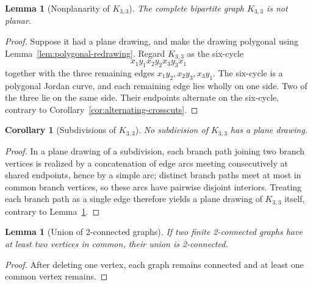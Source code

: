 \documentclass[11pt]{article}
\theoremstyle{mainplain}
\newtheorem{lemma}[theorem]{Lemma}
\newtheorem{corollary}[theorem]{Corollary}
\theoremstyle{mainroman}
\theoremstyle{definition}
\numberwithin{equation}{section}
\begin{document}
\begin{lemma}[Nonplanarity of $K_{3,3}$]\label{lem:k33}
The complete bipartite graph $K_{3,3}$ is not planar.
\end{lemma}
\begin{proof}
Suppose it had a plane drawing, and make the drawing polygonal using
Lemma~\ref{lem:polygonal-redrawing}. Regard $K_{3,3}$ as the six-cycle
\[
 x_1y_1x_2y_2x_3y_3x_1
\]
together with the three remaining edges
$x_1y_2,x_2y_3,x_3y_1$. The six-cycle is a polygonal Jordan curve, and
each remaining edge lies wholly on one side. Two of the three lie on
the same side. Their endpoints alternate on the six-cycle, contrary to
Corollary~\ref{cor:alternating-crosscuts}.
\end{proof}

\begin{corollary}[Subdivisions of $K_{3,3}$]\label{cor:k33-subdivision}
No subdivision of $K_{3,3}$ has a plane drawing.
\end{corollary}
\begin{proof}
In a plane drawing of a subdivision, each branch path joining two
branch vertices is realized by a concatenation of edge arcs meeting
consecutively at shared endpoints, hence by a simple arc; distinct
branch paths meet at most in common branch vertices, so these arcs
have pairwise disjoint interiors. Treating each branch path as a
single edge therefore yields a plane drawing of $K_{3,3}$ itself,
contrary to Lemma~\ref{lem:k33}.
\end{proof}

\begin{lemma}[Union of 2-connected graphs]\label{lem:union-two-connected}
If two finite 2-connected graphs have at least two vertices in common,
their union is 2-connected.
\end{lemma}
\begin{proof}
After deleting one vertex, each graph remains connected and at least
one common vertex remains.
\end{proof}
\end{document}
